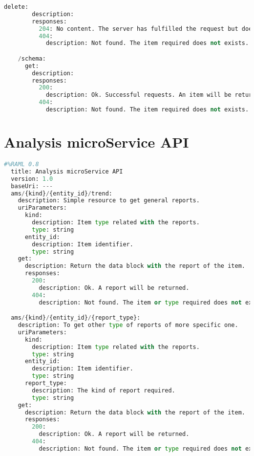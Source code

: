 \begin{lstlisting}[language=python,frame=none]
      delete:
        description:
        responses:
          204: No content. The server has fulfilled the request but does not need to return an entity-body.
          404:
            description: Not found. The item required does not exists.

    /schema:
      get:
        description:
        responses:
          200:
            description: Ok. Successful requests. An item will be returned.
          404:
            description: Not found. The item required does not exists.

\end{lstlisting}

\section{Analysis microService API}

\begin{lstlisting}[language=python,frame=none]
  #%RAML 0.8
  title: Analysis microService API
  version: 1.0
  baseUri: ---
  ams/{kind}/{entity_id}/trend:
    description: Simple resource to get general reports.
    uriParameters:
      kind:
        description: Item type related with the reports.
        type: string
      entity_id:
        description: Item identifier.
        type: string
    get:
      description: Return the data block with the report of the item.
      responses:
        200:
          description: Ok. A report will be returned.
        404:
          description: Not found. The item or type required does not exists.

  ams/{kind}/{entity_id}/{report_type}:
    description: To get other type of reports of more specific one.
    uriParameters:
      kind:
        description: Item type related with the reports.
        type: string
      entity_id:
        description: Item identifier.
        type: string
      report_type:
        description: The kind of report required.
        type: string
    get:
      description: Return the data block with the report of the item.
      responses:
        200:
          description: Ok. A report will be returned.
        404:
          description: Not found. The item or type required does not exists.

\end{lstlisting}
